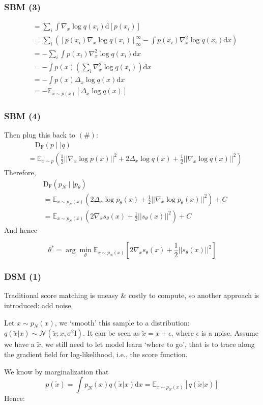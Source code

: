 \documentclass{beamer}
\begin{document}
\begin{frame}[t]
\frametitle{SBM (3)}
\begin{align*}
&=\sum_i\int \nabla_x\log q(x_i)\text{d}[p(x_i)]\\
&=\sum_i\left(\left[p(x_i)\nabla_x\log q(x_i)\right]_{\infty}^{\infty}-\int p(x_i)\nabla_x^2\log q(x_i)\text{d}x\right)\\
&=-\sum_i\int p(x_i)\nabla_x^2\log q(x_i)\text{d}x\\
&=-\int p(x)\left(\sum_i \nabla_x^2\log q(x_i)\right)\text{d}x\\
&=-\int p(x)\Delta_x \log q(x)\text{d}x\\
&=-\mathbb{E}_{x\sim p(x)}[\Delta_x \log q(x)]
\end{align*}
\end{frame}

\begin{frame}[t]
\frametitle{SBM (4)}
Then plug this back to $(\#):$
\begin{align*}
&\quad\mathrm{D_F}(p\mid\mid q)\\&=\mathbb{E}_{x\sim p}\left(\frac{1}{2}||\nabla_x\log p(x)||^2+2\Delta_x\log q(x)+\frac{1}{2}||\nabla_x\log q(x)||^2\right)
\end{align*}
Therefore,
\begin{align*}
&\mathrm{D_F}(p_N\mid\mid p_\theta)\\&=\mathbb{E}_{x\sim p_N(x)}\left(2\Delta_x\log p_\theta(x)+\frac{1}{2}||\nabla_x\log p_\theta(x)||^2\right)+C\\
&=\mathbb{E}_{x\sim p_N(x)}\left(2\nabla_x s_\theta(x)+\frac{1}{2}||s_\theta(x)||^2\right)+C
\end{align*}
And hence
\begin{tcolorbox}[colback=blue!1!white,
                  colframe=blue!75!black]
$$\theta^*=\arg\min_\theta \mathbb{E}_{x\sim p_N(x)}\left[2\nabla_x s_\theta(x)+\frac{1}{2}||s_\theta(x)||^2\right]$$
\end{tcolorbox}
\end{frame}

\begin{frame}[t]
\frametitle{DSM (1)}
Traditional score matching is uneasy \& costly to compute, so another approach is introduced: add noise.
\vspace{1em}

Let $x\sim p_N(x)$, we `smooth' this sample to a distribution: $q(\tilde{x}|x)\sim \mathcal{N}(\tilde{x};x,\sigma^2\mathrm{I})$. It can be seen as $\tilde{x}=x+\epsilon$, where $\epsilon$ is a noise.
Assume we have a $\tilde{x}$, we still need to let model learn `where to go', that is to trace along the gradient field for log-likelihood, i.e., the score function.
\vspace{1em}

We know by marginalization that
$$
p(\tilde{x})=\int p_N(x)q(\tilde{x}|x)\text{d}x=\mathbb{E}_{x\sim p_N(x)}[q(\tilde{x}|x)]
$$
Hence:
\end{frame}
\end{document}
